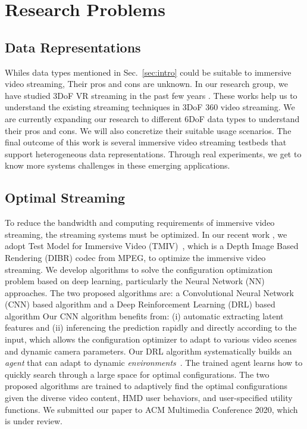 \section{Research Problems}
\subsection{Data Representations}\label{sec:data_representation}

Whiles data types mentioned in Sec.~\ref{sec:intro} could be suitable to immersive video streaming,
Their pros and cons are unknown.
In our research group, we have studied 3DoF VR streaming in the past few years \cite{FYHH20,FLPH19}. 
These works help us to understand the existing streaming techniques in 3DoF 360{\degree} video streaming.
We are currently expanding our research to different 6DoF data types to understand their pros and cons.
We will also concretize their suitable usage scenarios.
The final outcome of this work is several immersive video streaming testbeds that support heterogeneous data representations.
Through real experiments, we get to know more systems challenges in these emerging applications.
\subsection{Optimal Streaming}\label{sec:optimal_streaming}

To reduce the bandwidth and computing requirements of immersive video streaming, the streaming systems must be optimized.
In our recent work \cite{mm20_tr},
we adopt Test Model for Immersive Video (TMIV)~\cite{mpeg_N18470,mpeg_N18577,mpeg_N18795}, 
which is a Depth Image Based Rendering (DIBR) codec from MPEG, to optimize the immersive video streaming.
We develop algorithms to solve the configuration optimization problem based on deep learning, particularly the Neural Network (NN) approaches.
The two proposed algorithms are:
a Convolutional Neural Network (CNN) based algorithm and a Deep Reinforcement Learning (DRL) based algorithm
Our CNN algorithm benefits from: (i) automatic extracting latent features and 
(ii) inferencing the prediction rapidly and directly according to the input, which allows the configuration optimizer to 
adapt to various video scenes and dynamic camera parameters.
Our DRL algorithm systematically builds an {\em agent} that can adapt to dynamic {\em environments}~\cite{SB18,PZWL+19,HZZS18,CIZI+19}.
The trained agent learns how to quickly search through a large space for optimal configurations. 
The two proposed algorithms are
trained to adaptively find the optimal configurations given the diverse video content, HMD user behaviors, and user-specified utility functions.
We submitted our paper to ACM Multimedia Conference 2020, which is under review.


